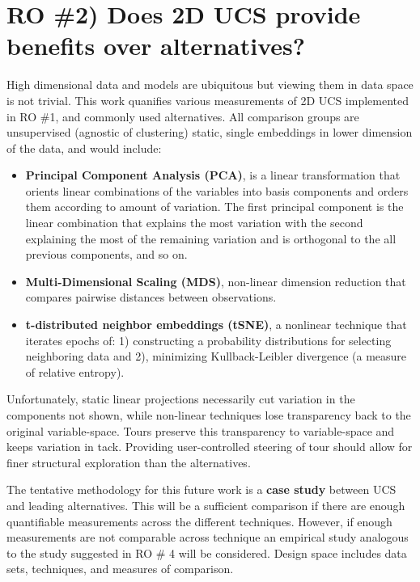 \documentclass{monashthesis}
\begin{document}
\section{RO \#2) Does 2D UCS provide benefits over
alternatives?}\label{ro-2-does-2d-ucs-provide-benefits-over-alternatives}

High dimensional data and models are ubiquitous but viewing them in data
space is not trivial. This work quanifies various measurements of 2D UCS
implemented in RO \#1, and commonly used alternatives. All comparison
groups are unsupervised (agnostic of clustering) static, single
embeddings in lower dimension of the data, and would include:

\begin{itemize}
\tightlist
\item
  \textbf{Principal Component Analysis (PCA)}, is a linear
  transformation that orients linear combinations of the variables into
  basis components and orders them according to amount of variation. The
  first principal component is the linear combination that explains the
  most variation with the second explaining the most of the remaining
  variation and is orthogonal to the all previous components, and so on.
\item
  \textbf{Multi-Dimensional Scaling (MDS)}, non-linear dimension
  reduction that compares pairwise distances between observations.
\item
  \textbf{t-distributed neighbor embeddings (tSNE)}, a nonlinear
  technique that iterates epochs of: 1) constructing a probability
  distributions for selecting neighboring data and 2), minimizing
  Kullback-Leibler divergence (a measure of relative entropy).
\end{itemize}

Unfortunately, static linear projections necessarily cut variation in
the components not shown, while non-linear techniques lose transparency
back to the original variable-space. Tours preserve this transparency to
variable-space and keeps variation in tack. Providing user-controlled
steering of tour should allow for finer structural exploration than the
alternatives.

The tentative methodology for this future work is a \textbf{case study}
between UCS and leading alternatives. This will be a sufficient
comparison if there are enough quantifiable measurements across the
different techniques. However, if enough measurements are not comparable
across technique an empirical study analogous to the study suggested in
RO \# 4 will be considered. Design space includes data sets, techniques,
and measures of comparison.
\end{document}
